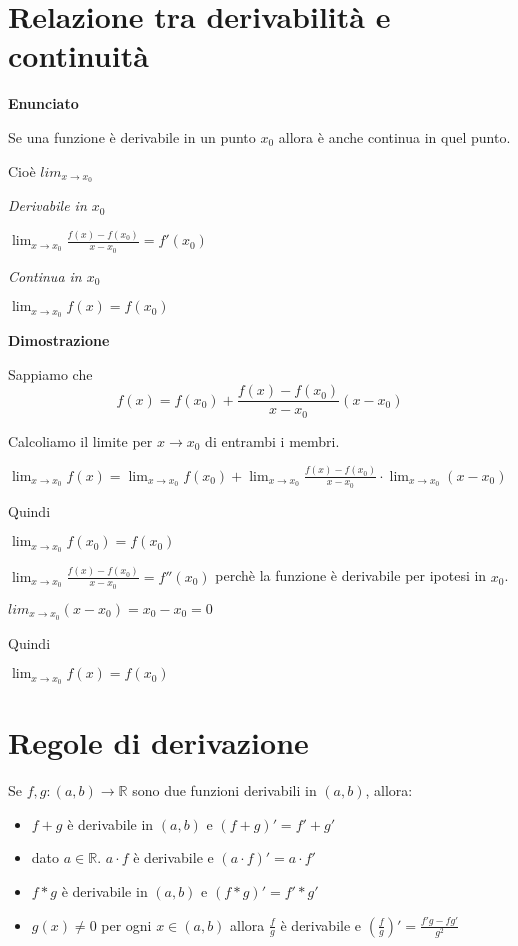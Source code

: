 \section{Relazione tra derivabilità e continuità}

\textbf{Enunciato}

Se una funzione è derivabile in un punto $x_0$ allora è anche continua in quel punto.

Cioè $lim_{x\to x_0}$
\begin{tip}
\textit{Derivabile in $x_0$}

$\lim_{x\to x_0} \frac{f(x)-f(x_0)}{x-x_0} = f'(x_0)$

\textit{Continua in $x_0$}

$\lim_{x\to x_0} f(x) = f(x_0)$

\end{tip} 

\textbf{Dimostrazione}

Sappiamo che $$f(x) = f(x_0) + \frac{f(x)-f(x_0)}{x-x_0} (x-x_0)$$

Calcoliamo il limite per $x \to x_0$ di entrambi i membri.

$\lim_{x\to x_0} f(x) = \lim_{x\to x_0} f(x_0) + \lim_{x\to x_0} \frac{f(x)-f(x_0)}{x-x_0} \cdot \lim_{x\to x_0} (x-x_0)$

Quindi

$\lim_{x\to x_0} f(x_0) = f(x_0)$

$\lim_{x\to x_0} \frac{f(x)-f(x_0)}{x-x_0} = f''(x_0)$ perchè la funzione è derivabile per ipotesi in $x_0$.

$lim_{x\to x_0} (x-x_0) = x_0 - x_0 = 0$

Quindi 

$\lim_{x\to x_0} f(x) = f(x_0)$

\section{Regole di derivazione}
Se $f,g: (a,b) \to \mathbb{R}$ sono due funzioni derivabili in $(a,b)$, allora:

\begin{itemize}
\item $f+g$ è derivabile in $(a,b)$ e $(f+g)' = f' + g'$
\item dato $a \in \mathbb{R}$. $a \cdot f$ è derivabile e $(a\cdot f)' = a \cdot f'$
\item $f*g$ è derivabile in $(a,b)$ e $(f*g)' = f' * g'$
\item $g(x) \neq 0$ per ogni $x \in (a,b)$ allora $\frac{f}{g}$ è derivabile e $(\frac{f}{g})' = \frac{f'g - fg'}{g^2}$ 
\end{itemize}

